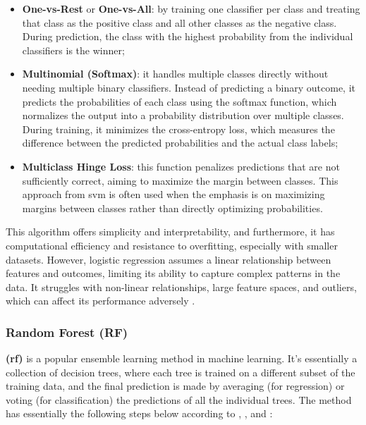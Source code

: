 \begin{itemize}
    \item \textbf{One-vs-Rest} or \textbf{One-vs-All}: by training one classifier per class and treating that class as the positive class and all other classes as the negative class. During prediction, the class with the highest probability from the individual classifiers is the winner;
    \item \textbf{Multinomial (Softmax)}: it handles multiple classes directly without needing multiple binary classifiers. Instead of predicting a binary outcome, it predicts the probabilities of each class using the softmax function, which normalizes the output into a probability distribution over multiple classes. During training, it minimizes the cross-entropy loss, which measures the difference between the predicted probabilities and the actual class labels;
    \item \textbf{Multiclass Hinge Loss}: this function penalizes predictions that are not sufficiently correct, aiming to maximize the margin between classes. This approach from \gls{svm} is often used when the emphasis is on maximizing margins between classes rather than directly optimizing probabilities.
\end{itemize}

This algorithm offers simplicity and interpretability, and furthermore, it has computational efficiency and resistance to overfitting, especially with smaller datasets. However, logistic regression assumes a linear relationship between features and outcomes, limiting its ability to capture complex patterns in the data. It struggles with non-linear relationships, large feature spaces, and outliers, which can affect its performance adversely \cite{Russel2010}.


\subsubsection{Random Forest (RF)}
\label{subsubsec:machine_learning_random_forest}

\textbf{ (\gls{rf})} is a popular ensemble learning method in machine learning. It's essentially a collection of decision trees, where each tree is trained on a different subset of the training data, and the final prediction is made by averaging (for regression) or voting (for classification) the predictions of all the individual trees. The method has essentially the following steps below according to \textcite{Breiman2001}, \textcite{Hartshorn2016}, and \textcite{Genuer2020}:

